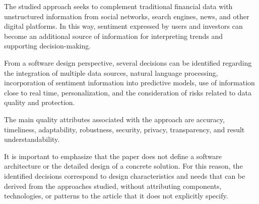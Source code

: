 The studied approach seeks to complement traditional financial data with unstructured information from social networks, search engines, news, and other digital platforms. In this way, sentiment expressed by users and investors can become an additional source of information for interpreting trends and supporting decision-making.

\vspace{2mm}

From a software design perspective, several decisions can be identified regarding the integration of multiple data sources, natural language processing, incorporation of sentiment information into predictive models, use of information close to real time, personalization, and the consideration of risks related to data quality and protection.

\vspace{2mm}

The main quality attributes associated with the approach are accuracy, timeliness, adaptability, robustness, security, privacy, transparency, and result understandability.

\vspace{2mm}

It is important to emphasize that the paper does not define a software architecture or the detailed design of a concrete solution. For this reason, the identified decisions correspond to design characteristics and needs that can be derived from the approaches studied, without attributing components, technologies, or patterns to the article that it does not explicitly specify.